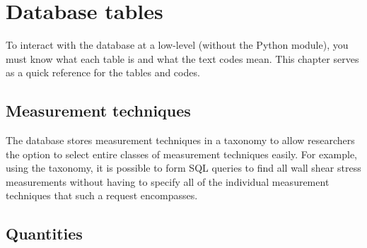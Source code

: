 %
\chapter{Database tables}

To interact with the database at a low-level (without the Python module), you
must know what each table is and what the text codes mean.  This chapter serves
as a quick reference for the tables and codes.


\section{Measurement techniques}

The database stores measurement techniques in a taxonomy to allow researchers
the option to select entire classes of measurement techniques easily.  For
example, using the taxonomy, it is possible to form SQL queries to find all
wall shear stress measurements without having to specify all of the individual
measurement techniques that such a request encompasses.




\section{Quantities}


